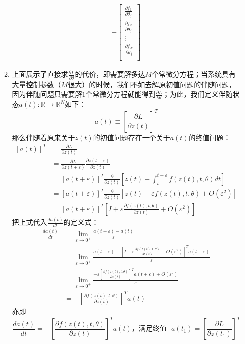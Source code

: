 \documentclass[11pt]{article}
\begin{document}
\begin{enumerate}
\begin{enumerate}
\begin{gather*}
+
\begin{bmatrix}
\frac{\partial f_1}{\partial\theta_j}\\
\frac{\partial f_2}{\partial\theta_j}\\
\vdots\\
\frac{\partial f_N}{\partial\theta_j}\\
\end{bmatrix}
\end{gather*}
\item 上面展示了直接求$\frac{\partial L}{\partial\theta}$的代价，即需要解多达$M$个常微分方程；当系统具有大量控制参数（$M$很大）的时候，我们不如去解原初值问题的伴随问题，因为伴随问题只需要解$1$个常微分方程就能得到$\frac{\partial L}{\partial\theta}$；为此，我们定义伴随状态$a(t):\mathbb{R}\to\mathbb{R}^N$如下：\[
a(t)\equiv\left[\frac{\partial L}{\partial z(t)}\right]^T
\]那么伴随着原来关于$z(t)$的初值问题存在一个关于$a(t)$的终值问题：\[
\begin{split}
[a(t)]^T&=\frac{\partial L}{\partial z(t)}\\
&=\frac{\partial L}{\partial z(t+\varepsilon)}\frac{\partial z(t+\varepsilon)}{\partial z(t)}\\
&=[a(t+\varepsilon)]^T\frac{\partial}{\partial z(t)}\left[z(t)+\int_t^{t+\varepsilon}f(z(t),t,\theta)dt\right]\\
&=[a(t+\varepsilon)]^T\frac{\partial}{\partial z(t)}\left[z(t)+\varepsilon f(z(t),t,\theta)+O(\varepsilon^2)\right]\\
&=[a(t+\varepsilon)]^T\left[I+\varepsilon \frac{\partial f(z(t),t,\theta)}{\partial z(t)}+O(\varepsilon^2)\right]
\end{split}
\]把上式代入$\frac{da(t)}{dt}$的定义式：\[
\begin{split}
\frac{da(t)}{dt}&=\lim_{\varepsilon\to0^+}\frac{a(t+\varepsilon)-a(t)}{\varepsilon}\\
&=\lim_{\varepsilon\to0^+}\frac{a(t+\varepsilon)-\left[I+\varepsilon \frac{\partial f(z(t),t,\theta)}{\partial z(t)}+O(\varepsilon^2)\right]^Ta(t+\varepsilon)}{\varepsilon}\\
&=\lim_{\varepsilon\to0^+}\frac{-\varepsilon\left[\frac{\partial f(z(t),t,\theta)}{\partial z(t)}\right]^Ta(t+\varepsilon)+O(\varepsilon^2)}{\varepsilon}\\
&=-\left[\frac{\partial f(z(t),t,\theta)}{\partial z(t)}\right]^Ta(t)
\end{split}
\]亦即\[
\frac{da(t)}{dt}=-\left[\frac{\partial f(z(t),t,\theta)}{\partial z(t)}\right]^Ta(t)\text{，满足终值}\text{ }a(t_1)=\left[\frac{\partial L}{\partial z(t_1)}\right]^T
\]
\end{enumerate}
\end{enumerate}
\end{document}
